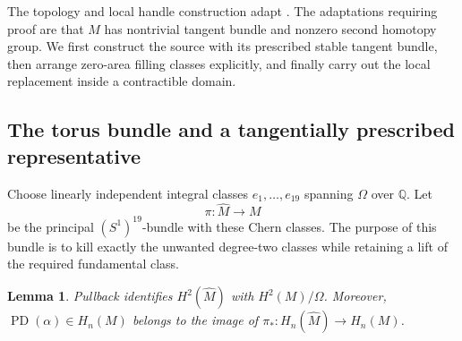 \documentclass[11pt]{article}
\numberwithin{equation}{section}
\newtheorem{lemma}[theorem]{Lemma}
\theoremstyle{definition}
\theoremstyle{remark}
\begin{document}
The topology and local handle construction adapt
\cite[Lemmas~3.3--3.6]{W}.  The adaptations requiring proof are that $M$
has nontrivial tangent bundle and nonzero second homotopy group.  We first
construct the source with its prescribed stable tangent bundle, then
arrange zero-area filling classes explicitly, and finally carry out the
local replacement inside a contractible domain.

\subsection{The torus bundle and a tangentially prescribed representative}

Choose linearly independent integral classes $e_1,\ldots,e_{19}$ spanning
$\Omega$ over $\mathbb Q$.  Let
\[
                  \pi:\widehat M\longrightarrow M
\]
be the principal $(S^1)^{19}$-bundle with these Chern classes.  The purpose
of this bundle is to kill exactly the unwanted degree-two classes while
retaining a lift of the required fundamental class.

\begin{lemma}\label{top:lem:bundle}
Pullback identifies $H^2(\widehat M)$ with $H^2(M)/\Omega$.  Moreover,
$\operatorname{PD}(\alpha)\in H_n(M)$ belongs to the image of
$\pi_*:H_n(\widehat M)\to H_n(M)$.
\end{lemma}
\end{document}
